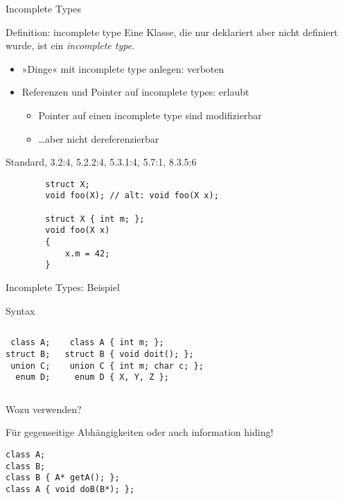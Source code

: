 \begin{frame}[fragile]{Incomplete Types}
	\begin{block}{Definition: incomplete type}
		Eine Klasse, die nur deklariert aber nicht definiert wurde, ist ein \emph{incomplete type}.
	\end{block}
	
	\pause
	
	\begin{itemize}
		\item »Dinge« mit incomplete type anlegen: verboten
		\item Referenzen und Pointer auf incomplete types: erlaubt
		\begin{itemize}
			\item Pointer auf einen incomplete type sind modifizierbar
			\item \dots aber nicht dereferenzierbar
		\end{itemize}
	\end{itemize}
	
	\tiny{Standard, 3.2:4, 5.2.2:4, 5.3.1:4, 5.7:1, 8.3.5:6}
	
	\begin{lstlisting}
		struct X;
		void foo(X); // alt: void foo(X x);
		
		struct X { int m; };
		void foo(X x)
		{
		    x.m = 42;
		}
	\end{lstlisting}
\end{frame}


\begin{frame}[fragile]{Incomplete Types: Beispiel}
	\begin{block}{Syntax}
		\begin{columns}[t]
			\begin{lstlisting}
 class A;
struct B;
 union C;
  enum D;
			\end{lstlisting}
			
			\begin{lstlisting}
 class A { int m; };
struct B { void doit(); };
 union C { int m; char c; };
  enum D { X, Y, Z };
			\end{lstlisting}
		\end{columns}
	\end{block}
	
	\pause
	
	Wozu verwenden?
	\pause
	
	Für gegenseitige Abhängigkeiten oder auch information hiding!
	\begin{lstlisting}
class A;
class B;
class B { A* getA(); };
class A { void doB(B*); };
	\end{lstlisting}
\end{frame}

